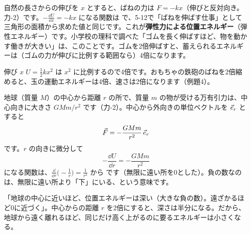 自然の長さからの伸びを $x$ とすると、ばねの力は $F=-kx$（伸びと反対向き。力-2）です。$-\tfrac{\dd U}{\dd x}=-kx$ になる関数は
\label{ph:力-4:bane}で、5-12で「ばねを伸ばす仕事」として三角形の面積から求めた値と同じです。これが\textbf{弾性力による位置エネルギー}（弾性エネルギー）です。\label{ph:力-4:gomu}小学校の理科で調べた「ゴムを長く伸ばすほど、物を動かす働きが大きい」は、このことです。ゴムを2倍伸ばすと、蓄えられるエネルギーは（ゴムの力が伸びに比例する範囲なら）4倍になります。

\begin{phbaisuru}{伸び $x$}
$U=\tfrac{1}{2}kx^2$ は $x^2$ に比例するので4倍です。おもちゃの鉄砲のばねを2倍縮めると、玉の運動エネルギーは4倍、速さは2倍になります（例題4）。
\end{phbaisuru}

地球（質量 $M$）の中心から距離 $r$ の所で、質量 $m$ の物が受ける万有引力は、中心向きに大きさ $GMm/r^2$ です（力-2）。中心から外向きの単位ベクトルを $\vec{e}_r$ とすると
\[\vec{F}=-\frac{GMm}{r^2}\,\vec{e}_r\]
です。$r$ の向きに微分して
\[-\frac{\dd U}{\dd r}=-\frac{GMm}{r^2}\]
になる関数は、$\frac{\dd}{\dd r}\bigl(-\frac{1}{r}\bigr)=\frac{1}{r^2}$ から
\label{ph:力-4:banyuu}です（無限に遠い所を0とした）。負の数なのは、無限に遠い所より「下」にいる、という意味です。

\begin{phyomi}[$U=-\dfrac{GMm}{r}$]
「地球の中心に近いほど、位置エネルギーは深い（大きな負の数）。遠ざかるほど0に近づく」。中心からの距離 $r$ を2倍にすると、深さは半分になる。だから、地球から遠く離れるほど、同じだけ高く上がるのに要るエネルギーは小さくなる。
\end{phyomi}

\begin{bkfigure}
\label{ph:力-4:fig-banyuu}
\end{bkfigure}

